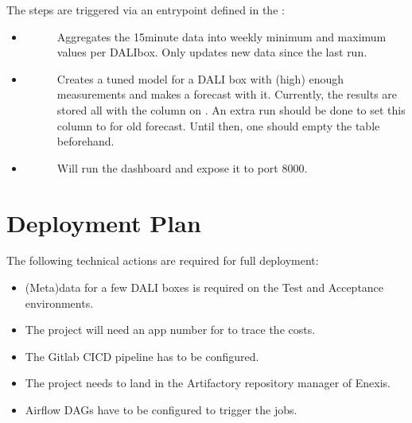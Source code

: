 \documentclass[letterpaper,10pt,english]{sphinxmanual}
\begin{document}
The steps are triggered via an entrypoint defined in the :
\begin{itemize}
\item {} \begin{description}
\item[{}] \leavevmode
Aggregates the 15\sphinxhyphen{}minute data into weekly minimum and maximum values per DALI\sphinxhyphen{}box.
Only updates new data since the last run.

\end{description}

\item {} \begin{description}
\item[{}] \leavevmode
Creates a tuned model for a DALI box with (high) enough measurements and makes a forecast with it.
Currently, the results are stored all with the  column on .
An extra run should be done to set this column to  for old forecast.
Until then, one should empty the table beforehand.

\end{description}

\item {} \begin{description}
\item[{}] \leavevmode
Will run the dashboard and expose it to port 8000.

\end{description}

\end{itemize}


\section{Deployment Plan}
\label{\detokenize{deployment:deployment-plan}}
The following technical actions are required for full deployment:
\begin{itemize}
\item {} 
(Meta)data for a few DALI boxes is required on the Test and Acceptance environments.

\item {} 
The project will need an app number for to trace the costs.

\item {} 
The Gitlab CICD pipeline has to be configured.

\item {} 
The project needs to land in the Artifactory repository manager of Enexis.

\item {} 
Airflow DAGs have to be configured to trigger the jobs.

\end{itemize}
\end{document}
